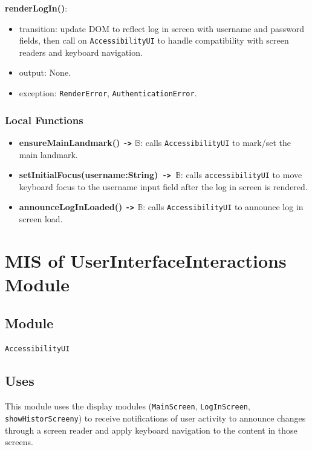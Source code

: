\documentclass[12pt, titlepage]{article}
\newcommand{\Bool}{\ensuremath{\mathbb{B}}}
\begin{document}
\noindent \textbf{renderLogIn()}:
\begin{itemize}
\item transition: update DOM to reflect log in screen with username and password fields, 
then call on \texttt{AccessibilityUI} to 
handle compatibility with screen readers and keyboard navigation.
\item output: None.
\item exception: \texttt{RenderError}, \texttt{AuthenticationError}.
\end{itemize}

\subsubsection{Local Functions}
\begin{itemize}
  \item \textbf{ensureMainLandmark()  \texttt{->} \Bool}: calls
    \texttt{AccessibilityUI}
    to mark/set the main landmark.
  \item \textbf{setInitialFocus(username:String)\texttt{ -> }\Bool}:
    calls \texttt{accessibilityUI} to move keyboard focus to the username
    input field after the log in screen is rendered.
  \item \textbf{announceLogInLoaded() \texttt{->} \Bool}: calls
    \texttt{AccessibilityUI}
    to announce log in screen load.
\end{itemize}

\section{MIS of UserInterfaceInteractions Module}\label{UI_accessibility}

\subsection{Module}

\texttt{AccessibilityUI}

\subsection{Uses}

This module uses the display modules (\texttt{MainScreen}, \texttt{LogInScreen},
\texttt{showHistorScreeny}) to receive notifications of user activity
to announce changes
through a screen reader and apply keyboard navigation to the content
in those screens.
\end{document}
